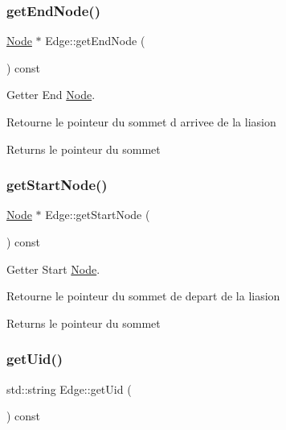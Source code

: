 \subsubsection{\texorpdfstring{get\+End\+Node()}{getEndNode()}}
{\footnotesize\ttfamily \mbox{\hyperlink{class_node}{Node}} $\ast$ Edge\+::get\+End\+Node (\begin{DoxyParamCaption}{ }\end{DoxyParamCaption}) const}



Getter End \mbox{\hyperlink{class_node}{Node}}. 

Retourne le pointeur du sommet d arrivee de la liasion

\begin{DoxyReturn}{Returns}
le pointeur du sommet 
\end{DoxyReturn}
\mbox{\label{class_edge_aa83e468b6d797b013ab60fc43e6af8a6}} 
\subsubsection{\texorpdfstring{get\+Start\+Node()}{getStartNode()}}
{\footnotesize\ttfamily \mbox{\hyperlink{class_node}{Node}} $\ast$ Edge\+::get\+Start\+Node (\begin{DoxyParamCaption}{ }\end{DoxyParamCaption}) const}



Getter Start \mbox{\hyperlink{class_node}{Node}}. 

Retourne le pointeur du sommet de depart de la liasion

\begin{DoxyReturn}{Returns}
le pointeur du sommet 
\end{DoxyReturn}
\mbox{\label{class_edge_abf97244f7446b4192dfa1e87a156920d}} 
\subsubsection{\texorpdfstring{get\+Uid()}{getUid()}}
{\footnotesize\ttfamily std\+::string Edge\+::get\+Uid (\begin{DoxyParamCaption}{ }\end{DoxyParamCaption}) const}



